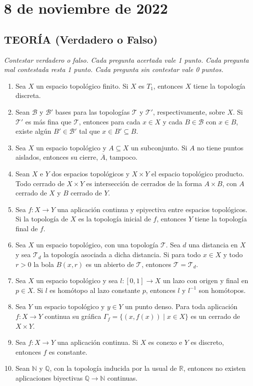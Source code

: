 \newpage

\section{8 de noviembre de 2022}

\subsection*{TEORÍA (Verdadero o Falso)}
\textit{Contestar verdadero o falso. Cada pregunta acertada vale 1 punto. Cada pregunta mal contestada resta 1 punto. Cada pregunta sin contestar vale 0 puntos.}

\begin{enumerate}
    \item Sea $X$ un espacio topológico finito. Si $X$ es $T_1$, entonces $X$ tiene la topología discreta.
    \item Sean $\mathcal{B}$ y $\mathcal{B}'$ bases para las topologías $\mathcal{T}$ y $\mathcal{T}'$, respectivamente, sobre $X$. Si $\mathcal{T}'$ es más fina que $\mathcal{T}$, entonces para cada $x \in X$ y cada $B \in \mathcal{B}$ con $x \in B$, existe algún $B' \in \mathcal{B}'$ tal que $x \in B' \subseteq B$.
    \item Sea $X$ un espacio topológico y $A \subseteq X$ un subconjunto. Si $A$ no tiene puntos aislados, entonces su cierre, $\overline{A}$, tampoco.
    \item Sean $X$ e $Y$ dos espacios topológicos y $X \times Y$ el espacio topológico producto. Todo cerrado de $X \times Y$ es intersección de cerrados de la forma $A \times B$, con $A$ cerrado de $X$ y $B$ cerrado de $Y$.
    \item Sea $f: X \to Y$ una aplicación continua y epiyectiva entre espacios topológicos. Si la topología de $X$ es la topología inicial de $f$, entonces $Y$ tiene la topología final de $f$.
    \item Sea $X$ un espacio topológico, con una topología $\mathcal{T}$. Sea $d$ una distancia en $X$ y sea $\mathcal{T}_d$ la topología asociada a dicha distancia. Si para todo $x \in X$ y todo $r > 0$ la bola $B(x,r)$ es un abierto de $\mathcal{T}$, entonces $\mathcal{T} = \mathcal{T}_d$.
    \item Sea $X$ un espacio topológico y sea $l: [0, 1] \to X$ un lazo con origen y final en $p \in X$. Si $l$ es homótopo al lazo constante $p$, entonces $l$ y $l^{-1}$ son homótopos.
    \item Sea $Y$ un espacio topológico y $y \in Y$ un punto denso. Para toda aplicación $f: X \to Y$ continua su gráfica $\Gamma_f = \{(x, f(x)) \mid x \in X\}$ es un cerrado de $X \times Y$.
    \item Sea $f: X \to Y$ una aplicación continua. Si $X$ es conexo e $Y$ es discreto, entonces $f$ es constante.
    \item Sean $\mathbb{N}$ y $\mathbb{Q}$, con la topología inducida por la usual de $\mathbb{R}$, entonces no existen aplicaciones biyectivas $\mathbb{Q} \to \mathbb{N}$ continuas.
\end{enumerate}

